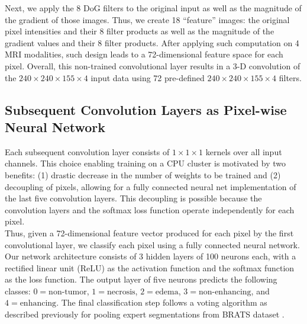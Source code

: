 \documentclass{llncs}
\begin{document}
\indent Next, we apply the 8 DoG filters to the original input as well as the magnitude of the gradient of those images. Thus, we create 18 ``feature'' images: the original pixel intensities and their 8 filter products as well as the magnitude of the gradient values and their 8 filter products. After applying such computation on 4 MRI modalities, such design leads to a 72-dimensional feature space for each pixel. Overall, this non-trained convolutional layer results in a 3-D convolution of the $240 \times 240 \times 155 \times 4$ input data using 72 pre-defined $240 \times 240 \times 155 \times 4$ filters.

\subsection{Subsequent Convolution Layers as Pixel-wise Neural Network}
Each subsequent convolution layer consists of  $1 \times 1 \times 1$ kernels over all input channels. This choice enabling training on a CPU cluster is motivated by two benefits: (1) drastic decrease in the number of weights to be trained and (2) decoupling of pixels, allowing for a fully connected neural net implementation of the last five convolution layers. This decoupling is possible because the convolution layers and the softmax loss function operate independently for each pixel. \\
\indent Thus, given a 72-dimensional feature vector produced for each pixel by the first convolutional layer, we classify each pixel using a fully connected neural network. Our network architecture consists of 3 hidden layers of 100 neurons each, with a rectified linear unit (ReLU) as the activation function and the softmax function as the loss function.  The output layer of five neurons predicts the following classes: $0 = \text{non-tumor}$, $1 = \text{necrosis}$, $2 = \text{edema}$, $3 = \text{non-enhancing}$, and $4 = \text{enhancing}$.  The final classification step follows a voting algorithm as described previously for pooling expert segmentations from BRATS dataset \cite{brats}. 

 
\end{document}
